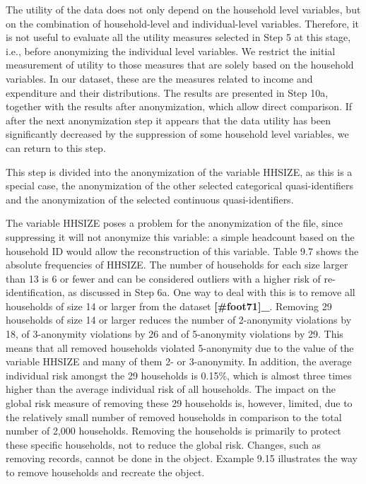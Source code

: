 \documentclass[letterpaper,10pt,english]{sphinxmanual}
\begin{document}
The utility of the data does not only depend on the household level
variables, but on the combination of household-level and
individual-level variables. Therefore, it is not useful to evaluate all
the utility measures selected in Step 5 at this stage, i.e., before
anonymizing the individual level variables. We restrict the initial
measurement of utility to those measures that are solely based on the
household variables. In our dataset, these are the measures related to
income and expenditure and their distributions. The results are
presented in Step 10a, together with the results after anonymization,
which allow direct comparison. If after the next anonymization step it
appears that the data utility has been significantly decreased by the
suppression of some household level variables, we can return to this
step.


This step is divided into the anonymization of the variable HHSIZE, as
this is a special case, the anonymization of the other selected
categorical quasi-identifiers and the anonymization of the selected
continuous quasi-identifiers.


The variable HHSIZE poses a problem for the anonymization of the file,
since suppressing it will not anonymize this variable: a simple
headcount based on the household ID would allow the reconstruction of
this variable. Table 9.7 shows the absolute frequencies of HHSIZE. The
number of households for each size larger than 13 is 6 or fewer and can
be considered outliers with a higher risk of re-identification, as
discussed in Step 6a. One way to deal with this is to remove all
households of size 14 or larger from the dataset {\color{red}\bfseries{}{[}\#foot71{]}\_}.
Removing 29 households of size 14 or larger reduces the number of
2-anonymity violations by 18, of 3-anonymity violations by 26 and of
5-anonymity violations by 29. This means that all removed households
violated 5-anonymity due to the value of the variable HHSIZE and many of
them 2- or 3-anonymity. In addition, the average individual risk amongst
the 29 households is 0.15\%, which is almost three times higher than the
average individual risk of all households. The impact on the global risk
measure of removing these 29 households is, however, limited, due to the
relatively small number of removed households in comparison to the total
number of 2,000 households. Removing the households is primarily to
protect these specific households, not to reduce the global risk.
 Changes, such as removing records, cannot be done in the
 object. Example 9.15 illustrates the way to remove households
and recreate the  object.
\end{document}
